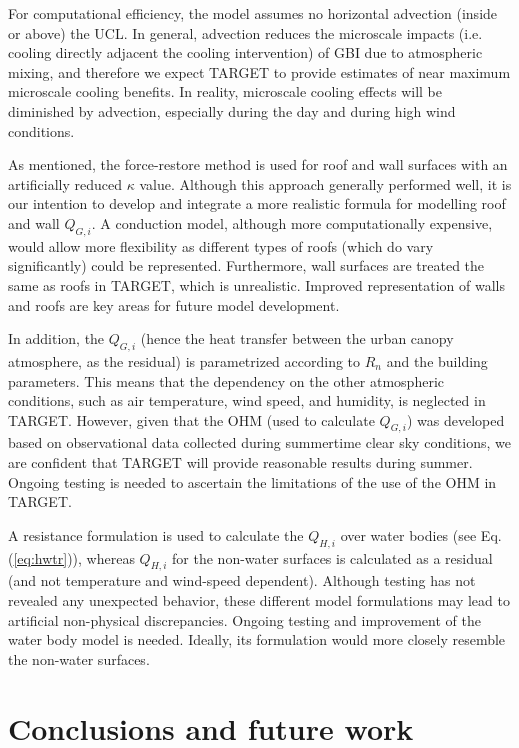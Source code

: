 \documentclass[gmd, manuscript]{copernicus}
\begin{document}
For computational efficiency, the model assumes no horizontal advection (inside or above) the UCL. In general, advection reduces the microscale impacts (i.e. cooling directly adjacent the cooling intervention) of GBI due to atmospheric mixing, and therefore we expect TARGET to provide estimates of near maximum microscale cooling benefits. In reality, microscale cooling effects will be diminished by advection, especially during the day and during high wind conditions.

As mentioned, the force-restore method is used for roof and wall surfaces with an artificially reduced \ensuremath{\kappa} value. Although this approach generally performed well, it is our intention to develop and integrate a more realistic formula for modelling roof and wall \ensuremath{Q_{G,i}}. A conduction model, although more computationally expensive, would allow more flexibility as different types of roofs (which do vary significantly) could be represented. Furthermore, wall surfaces are treated the same as roofs in TARGET, which is unrealistic. Improved representation of walls and roofs are key areas for future model development.  
 

In addition, 
the \ensuremath{Q_{G,i}} (hence the heat transfer between the urban canopy  atmosphere, as the residual) is parametrized according to \ensuremath{R_{n}} and the building parameters. This means that the dependency on the other atmospheric conditions, such as air temperature, wind speed, and humidity, is neglected in TARGET. However, given that the OHM  (used to calculate \ensuremath{Q_{G,i}}) was developed based on observational data collected during summertime clear sky conditions, we are confident that TARGET will provide reasonable results during summer. Ongoing testing is needed to ascertain the limitations of the use of the OHM in TARGET. 

A resistance formulation  is used to calculate the \ensuremath{Q_{H,i}} over water bodies (see Eq. (\ref{eq:hwtr})), whereas \ensuremath{Q_{H,i}} for the non-water surfaces is calculated as a residual (and not temperature and wind-speed dependent). Although testing has not revealed any  unexpected behavior, these different model formulations may  lead to artificial non-physical discrepancies. Ongoing testing and improvement of the water body model is needed. Ideally, its formulation would more closely resemble the non-water surfaces. 

\section{Conclusions and future work}\label{sec:conclusion}
\end{document}

